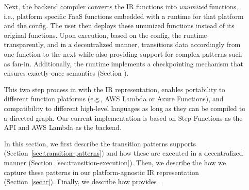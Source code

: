 Next, the \name{} backend compiler converts the IR functions into \textit{unumized} functions, i.e., platform specific FaaS functions embedded with a \name{} runtime for that platform and the \name{} config. The user then deploys these unumized functions instead of its original functions. Upon execution, based on the \name{} config, the \name{} runtime  transparently, and in a decentralized manner, transitions data accordingly from one function to the next while also providing support for complex patterns such as fan-in. Additionally, the
runtime implements a checkpointing mechanism that ensures exactly-once
semantics (Section ).

This two step process in \name{} with the IR representation, enables portability to different function platforms (e.g., AWS Lambda or Azure Functions), and compatibility to different high-level languages as long as they can be compiled to a directed graph. Our current implementation is based on Step Functions as the API and AWS Lambda as the backend.


In this section, we first describe the transition patterns \name{} supports (Section~\ref{sec:transition-patterns}) and how these are executed in a decentralized manner (Section~\ref{sec:transition-execution}). Then, we describe the how we capture these patterns in our platform-agnostic IR representation (Section~\ref{sec:ir}). Finally, we describe how \name{} provides . 


